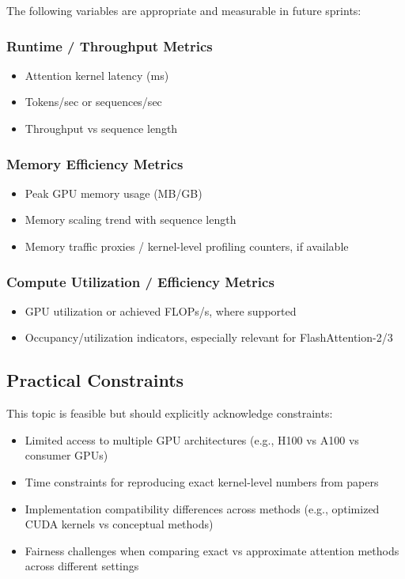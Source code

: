 \documentclass[12pt, a4paper]{article}
\begin{document}
The following variables are appropriate and measurable in future sprints:

\subsubsection{Runtime / Throughput Metrics}
\begin{itemize}
    \item Attention kernel latency (ms)
    \item Tokens/sec or sequences/sec
    \item Throughput vs sequence length
\end{itemize}

\subsubsection{Memory Efficiency Metrics}
\begin{itemize}
    \item Peak GPU memory usage (MB/GB)
    \item Memory scaling trend with sequence length
    \item Memory traffic proxies / kernel-level profiling counters, if available
\end{itemize}

\subsubsection{Compute Utilization / Efficiency Metrics}
\begin{itemize}
    \item GPU utilization or achieved FLOPs/s, where supported
    \item Occupancy/utilization indicators, especially relevant for FlashAttention-2/3 \parencite{dao2023flashattention2fasterattentionbetter, shah2024flashattention3fastaccurateattention}
\end{itemize}

\subsection{Practical Constraints}

This topic is feasible but should explicitly acknowledge constraints:
\begin{itemize}
    \item Limited access to multiple GPU architectures (e.g., H100 vs A100 vs consumer GPUs)
    \item Time constraints for reproducing exact kernel-level numbers from papers
    \item Implementation compatibility differences across methods (e.g., optimized CUDA kernels vs conceptual methods)
    \item Fairness challenges when comparing exact vs approximate attention methods across different settings \parencite{tay2020longrangearenabenchmark, zhang2025cabcomprehensiveattentionbenchmarking}
\end{itemize}
\end{document}
